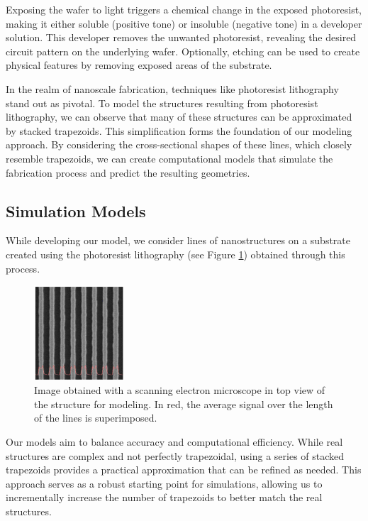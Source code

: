 Exposing the wafer to light triggers a chemical change in the exposed photoresist, making it 
either soluble (positive tone) or insoluble (negative tone) in a developer solution. This 
developer removes the unwanted photoresist, revealing the desired circuit pattern on the 
underlying wafer. Optionally, etching can be used to create physical features by removing 
exposed areas of the substrate.

In the realm of nanoscale fabrication, techniques like photoresist lithography stand out as 
pivotal. To model the structures resulting from photoresist lithography, we can observe that 
many of these structures can be approximated by stacked trapezoids. 
This simplification forms the foundation of our modeling approach. By considering the cross-sectional
shapes of these lines, which closely resemble trapezoids, 
we can create computational models that simulate the fabrication process and predict the resulting geometries.

\subsection{Simulation Models}

While developing our model, we consider lines of nanostructures on a substrate created using 
the photoresist lithography (see Figure \ref{fig:lines_TEM}) obtained through this process.

\begin{figure}[h]
\centering
\includegraphics[width=0.3\textwidth]{images/lines_modeled.png}
\caption{Image obtained with a scanning electron microscope in top view of the structure for modeling.
In red, the average signal over the length of the lines is superimposed.\cite{these_reche}}
\label{fig:lines_TEM}
\end{figure}

\medskip

Our models aim to balance accuracy and computational efficiency. While real structures are complex and not perfectly trapezoidal, using a series of stacked trapezoids provides a practical approximation that can be refined as needed. This approach serves as a robust starting point for simulations, allowing us to incrementally increase the number of trapezoids to better match the real structures.


